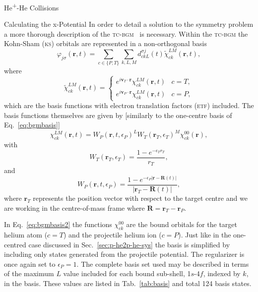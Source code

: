 \documentclass[a5paper, 9 pt]{extreport}
\begin{document}
\begin{chapter}{\texorpdfstring{He\textsuperscript{+}}{He+}-He Collisions \label{chap:hephe}}
\begin{section}{Calculating the x-Potential \label{sec:pot}}
      In order to detail a solution to the symmetry problem a more thorough description of the
      \textsc{tc-bgm}~\cite{tcbgm} is necessary. Within the \textsc{tc-bgm} the Kohn-Sham (\textsc{ks})
      orbitals are represented in a non-orthogonal basis
      \begin{equation} \label{eq:bgmexp}
         \varphi_{j \sigma}(\mathbf{r},t) = \sum\limits_{c \in \{P, T\}} \sum\limits_{k, L, M}
                               d_{c k L}^{\sigma j}(t) \tilde{\chi}^{LM}_{c k}(\mathbf{r},t),
      \end{equation}
      where
      \begin{equation} \label{eq:etfbasis}
         \tilde{\chi}^{L M}_{ck}(\mathbf{r},t) =
            \begin{cases}
               e^{i \mathbf{v}_T \cdot \mathbf{r}} {\chi}^{L M}_{c k}(\mathbf{r},t) & c = T, \\[2ex]
               e^{i \mathbf{v}_P \cdot \mathbf{r}} {\chi}^{L M}_{c k}(\mathbf{r},t) & c = P,
            \end{cases}
      \end{equation}
      which are the basis functions with electron translation factors (\textsc{etf}) included. The basis
      functions themselves are given by [similarly to the one-centre basis of Eq.~\eqref{eq:bgmbasis}]
      \begin{equation} \label{eq:bgmbasis2}
         \chi^{LM}_{ck} (\mathbf{r},t)
         = W_P( \mathbf{r},t, \epsilon_P)^L W_T(\mathbf{r}_T,\epsilon_T)^M \chi^{00}_{ck}(\mathbf{r}),
      \end{equation}
      with
      \begin{equation}
         W_T(\mathbf{r}_T,\epsilon_T) = \frac{1 - e^{-\epsilon_T r_T}}{r_T},
      \end{equation}
      and
      \begin{equation}
         W_P (\mathbf{r},t,\epsilon_P)
         = \frac{1 - e^{-\epsilon_P|\mathbf{r} - \mathbf{R}(t)|}}{|\mathbf{r}_T - \mathbf{R}(t)|},
      \end{equation}
      where $\mathbf{r}_T$ represents the position vector with respect to the target centre and we are
      working in the centre-of-mass frame where $\mathbf{R} = \mathbf{r}_T - \mathbf{r}_P$.

      In Eq.~\eqref{eq:bgmbasis2} the functions $\chi^{00}_{ck}$ are the bound orbitals for the target
      helium atom ($c = T$) and the projectile helium ion ($c = P$). Just like in the one-centred case
      discussed in Sec.~\ref{sec:p-he2p-he-sys} the basis is simplified by including only states
      generated from the projectile potential. The regularizer is once again set to $\epsilon_P = 1$.
      The complete basis set used may be described in terms of the maximum $L$ value included for each
      bound sub-shell, 1$s$-4$f$, indexed by $k$, in the basis. These values are listed in
      Tab.~\ref{tab:basis} and total 124 basis states.


\end{section}
\end{chapter}
\end{document}
